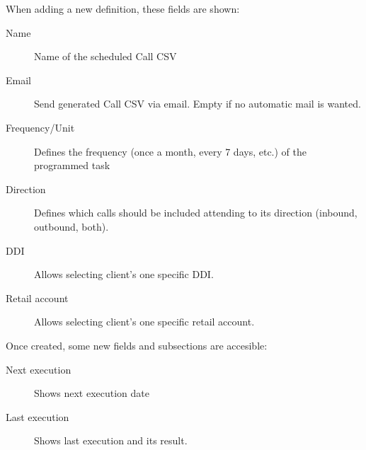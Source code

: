\documentclass[letterpaper,10pt,spanish]{sphinxmanual}
\begin{document}
When adding a new definition, these fields are shown:
\begin{description}
\item[{Name}] \leavevmode{}\label{administration_portal/client/retail/calls/call_csv_schedulers:term-name}
Name of the scheduled Call CSV

\item[{Email}] \leavevmode{}\label{administration_portal/client/retail/calls/call_csv_schedulers:term-email}
Send generated Call CSV via email. Empty if no automatic mail is wanted.

\item[{Frequency/Unit}] \leavevmode{}\label{administration_portal/client/retail/calls/call_csv_schedulers:term-frequency-unit}
Defines the frequency (once a month, every 7 days, etc.) of the programmed task

\item[{Direction}] \leavevmode{}\label{administration_portal/client/retail/calls/call_csv_schedulers:term-direction}
Defines which calls should be included attending to its direction (inbound, outbound, both).

\item[{DDI}] \leavevmode{}\label{administration_portal/client/retail/calls/call_csv_schedulers:term-ddi}
Allows selecting client's one specific DDI.

\item[{Retail account}] \leavevmode{}\label{administration_portal/client/retail/calls/call_csv_schedulers:term-retail-account}
Allows selecting client's one specific retail account.

\end{description}

Once created, some new fields and subsections are accesible:
\begin{description}
\item[{Next execution}] \leavevmode{}\label{administration_portal/client/retail/calls/call_csv_schedulers:term-next-execution}
Shows next execution date

\item[{Last execution}] \leavevmode{}\label{administration_portal/client/retail/calls/call_csv_schedulers:term-last-execution}
Shows last execution and its result.

\end{description}
\end{document}
